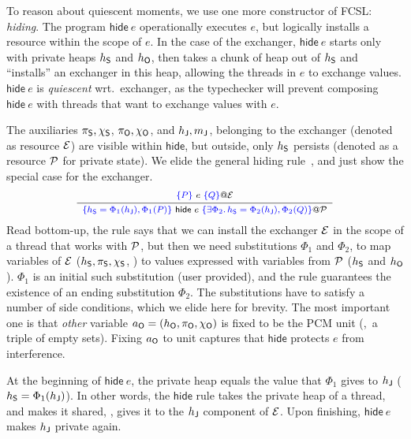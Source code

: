 To reason about quiescent moments, we use one more constructor of
FCSL: \emph{hiding}. The program $\mathsf{hide}\ e$ operationally
executes $e$, but logically installs a resource within the scope of
$e$. In the case of the exchanger, $\mathsf{hide}\ e$ starts only with
private heaps $h_{\mathsf{S}}$ and $h_{\mathsf{O}}$, then takes a chunk of heap out of
$h_{\mathsf{S}}$ and ``installs'' an exchanger in this heap, allowing the
threads in $e$ to exchange values. $\mathsf{hide}\ e$ is
\emph{quiescent} wrt.~exchanger, as the typechecker will prevent
composing $\mathsf{hide}\ e$ with threads that want to exchange values
with $e$.

The auxiliaries $\pi_{\mathsf{S}}, \chi_{\mathsf{S}}$, $\pi_{\mathsf{O}}, \chi_{\mathsf{O}}$, and $h_{\mathsf{J}},
{m_{\mathsf{J}}}$, belonging to the exchanger (denoted as resource $\cal E$)
are visible within $\mathsf{hide}$, but outside, only $h_{\mathsf{S}}$
persists (denoted as a resource $\cal P$ for private state).  We elide
the general hiding rule~\cite{Nanevski-al:ESOP14}, and just show the
special case for the exchanger.
\[
{\small{
\begin{array}{c}
\specK{\{P\}}\ e\ \specK{\{Q\}} @ \cal E\\[2pt]
\hline\\[-7pt]
\specK{\{\heaps = \Phi_1(\heapj), \Phi_1(P)\}}\ \mathsf{hide}~e\ \specK{\{\exists \Phi_2\ldot \heaps = \Phi_2(\heapj), \Phi_2(Q)\}} @ \cal P
\end{array}
}}
\]
Read bottom-up, the rule says that we can install the exchanger $\cal
E$ in the scope of a thread that works with $\cal P$, but then we need
substitutions $\Phi_1$ and $\Phi_2$, to map variables of $\cal E$
($h_{\mathsf{S}}, \pi_{\mathsf{S}}, \chi_{\mathsf{S}}$, \etc) to values expressed with variables
from $\cal P$ ($h_{\mathsf{S}}$ and $h_{\mathsf{O}}$). $\Phi_1$ is an initial such
substitution (user provided), and the rule guarantees the existence of
an ending substitution $\Phi_2$. The substitutions have to satisfy a
number of side conditions, which we elide here for brevity. The most
important one is that \emph{other} variable $a_{\mathsf{O}} = (h_{\mathsf{O}}, \pi_{\mathsf{O}},
\chi_{\mathsf{O}})$ is fixed to be the PCM unit (\ie,~a triple of empty
sets). Fixing $a_{\mathsf{O}}$ to unit captures that $\mathsf{hide}$ protects
$e$ from interference.

At the beginning of $\mathsf{hide}~e$, the private heap equals the
value that $\Phi_1$ gives to $h_{\mathsf{J}}$ ($h_{\mathsf{S}} = \Phi_1(h_{\mathsf{J}})$). In
other words, the $\mathsf{hide}$ rule takes the private heap of a
thread, and makes it shared, \ie, gives it to the $h_{\mathsf{J}}$ component
of $\cal E$. Upon finishing, $\mathsf{hide}~e$ makes $h_{\mathsf{J}}$ private
again.
%

